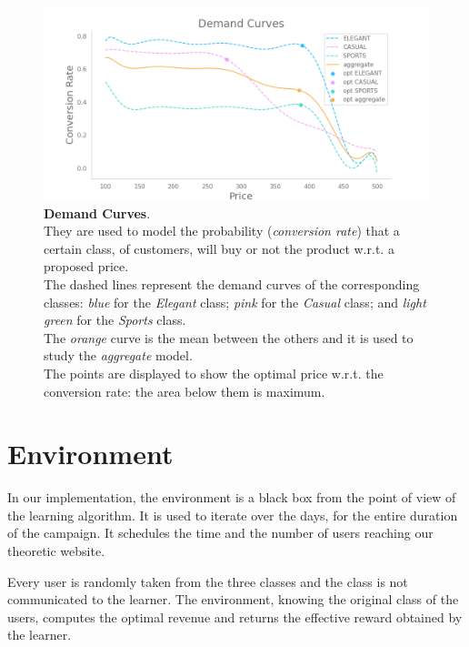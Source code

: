 \begin{figure}[H]
	\centering

	\includegraphics[width=1.0\textwidth]{images/demand_curves.png}
	\caption{\textbf{Demand Curves}.\\
		They are used to model the probability (\textit{conversion rate}) that a certain class, of customers, will buy or not the product w.r.t. a proposed price.\\
		The dashed lines represent the demand curves of the corresponding classes:
		\textit{blue} for the \textit{Elegant} class;
		\textit{pink} for the \textit{Casual} class; and
		\textit{light green} for the \textit{Sports} class.\\
		The \textit{orange} curve is the mean between the others and it is used to study the \textit{aggregate} model.\\
		The points are displayed to show the optimal price w.r.t. the conversion rate: the area below them is maximum.}
		\label{demandCurvesFig}
\end{figure}

\section{Environment}

In our implementation, the environment is a black box from the point of view of the learning algorithm.
It is used to iterate over the days, for the entire duration of the campaign.
It schedules the time and the number of users reaching our theoretic website.

Every user is randomly taken from the three classes and the class is not communicated to the learner. The environment, knowing the original class of the users, computes the optimal revenue and returns the effective reward obtained by the learner.

